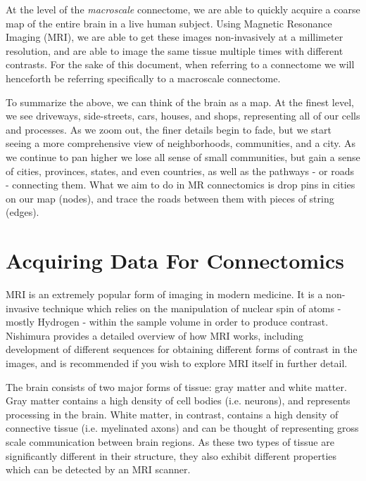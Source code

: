 At the level of the \textit{macroscale} connectome, we are able to quickly acquire a coarse map of the entire brain in a live human subject. Using Magnetic Resonance Imaging (MRI), we are able to get these images non-invasively at a millimeter resolution, and are able to image the same tissue multiple times with different contrasts. For the sake of this document, when referring to a connectome we will henceforth be referring specifically to a macroscale connectome.

To summarize the above, we can think of the brain as a map. At the finest level, we see driveways, side-streets, cars, houses, and shops, representing all of our cells and processes. As we zoom out, the finer details begin to fade, but we start seeing a more comprehensive view of neighborhoods, communities, and a city. As we continue to pan higher we lose all sense of small communities, but gain a sense of cities, provinces, states, and even countries, as well as the pathways - or roads - connecting them. What we aim to do in MR connectomics is drop pins in cities on our map (nodes), and trace the roads between them with pieces of string (edges).

\section{Acquiring Data For Connectomics}
\label{sec:acquire}
MRI is an extremely popular form of imaging in modern medicine. It is a non-invasive technique which relies on the manipulation of nuclear spin of atoms - mostly Hydrogen - within the sample volume in order to produce contrast. Nishimura \cite{nishimura} provides a detailed overview of how MRI works, including development of different sequences for obtaining different forms of contrast in the images, and is recommended if you wish to explore MRI itself in further detail.

The brain consists of two major forms of tissue: gray matter and white matter. Gray matter contains a high density of cell bodies (i.e. neurons), and represents processing in the brain. White matter, in contrast, contains a high density of connective tissue (i.e. myelinated axons) and can be thought of representing gross scale communication between brain regions. As these two types of tissue are significantly different in their structure, they also exhibit different properties which can be detected by an MRI scanner.


